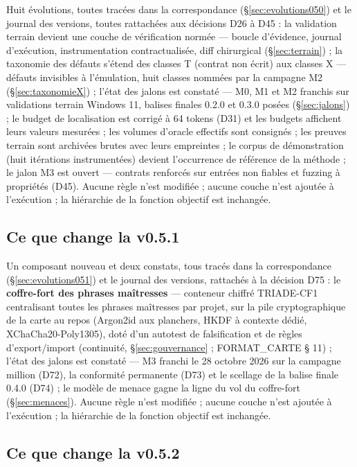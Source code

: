 Huit évolutions, toutes tracées dans la correspondance (§\ref{sec:evolutions050}) et le
journal des versions, toutes rattachées aux décisions D26 à D45 : la validation
terrain devient une couche de vérification normée — boucle d’évidence, journal
d’exécution, instrumentation contractualisée, diff chirurgical (§\ref{sec:terrain}) ;
la taxonomie des défauts s’étend des classes T (contrat non écrit) aux classes X —
défauts invisibles à l’émulation, huit classes nommées par la campagne M2
(§\ref{sec:taxonomieX}) ; l’état des jalons est constaté — M0, M1 et M2 franchis sur
validations terrain Windows 11, balises finales 0.2.0 et 0.3.0 posées
(§\ref{sec:jalons}) ; le budget de localisation est corrigé à 64 tokens (D31) et les
budgets affichent leurs valeurs mesurées ; les volumes d’oracle effectifs sont
consignés ; les preuves terrain sont archivées brutes avec leurs empreintes ; le
corpus de démonstration (huit itérations instrumentées) devient l’occurrence de
référence de la méthode ; le jalon M3 est ouvert — contrats renforcés sur entrées non
fiables et fuzzing à propriétés (D45). Aucune règle n’est modifiée ; aucune couche
n’est ajoutée à l’exécution ; la hiérarchie de la fonction objectif est inchangée.

\subsection{Ce que change la v0.5.1}\label{sec:nouveautes051}

Un composant nouveau et deux constats, tous tracés dans la correspondance
(§\ref{sec:evolutions051}) et le journal des versions, rattachés à la décision D75 : le
\textbf{coffre-fort des phrases maîtresses} — conteneur chiffré TRIADE-CF1 centralisant
toutes les phrases maîtresses par projet, sur la pile cryptographique de la carte au
repos (Argon2id aux planchers, HKDF à contexte dédié, XChaCha20-Poly1305), doté d’un
autotest de falsification et de règles d’export/import (continuité,
§\ref{sec:gouvernance} ; FORMAT\_CARTE § 11) ; l’état des jalons est constaté — M3
franchi le 28 octobre 2026 sur la campagne million (D72), la conformité permanente
(D73) et le scellage de la balise finale 0.4.0 (D74) ; le modèle de menace gagne la
ligne du vol du coffre-fort (§\ref{sec:menaces}). Aucune règle n’est modifiée ; aucune
couche n’est ajoutée à l’exécution ; la hiérarchie de la fonction objectif est inchangée.

\subsection{Ce que change la v0.5.2}\label{sec:nouveautes052}

